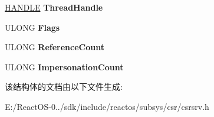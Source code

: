 \begin{DoxyCompactItemize}
\hyperlink{interfacevoid}{H\+A\+N\+D\+LE} {\bfseries Thread\+Handle}
\item 
\mbox{\label{struct___c_s_r___t_h_r_e_a_d_a0a30420ec286ab9a2a9e380c866e5ab2}} 
U\+L\+O\+NG {\bfseries Flags}
\item 
\mbox{\label{struct___c_s_r___t_h_r_e_a_d_a21854cc2eac5c8019867bd637a43c32d}} 
U\+L\+O\+NG {\bfseries Reference\+Count}
\item 
\mbox{\label{struct___c_s_r___t_h_r_e_a_d_a628800b73fd9f3d775b6b8a3cbf0a777}} 
U\+L\+O\+NG {\bfseries Impersonation\+Count}
\end{DoxyCompactItemize}


该结构体的文档由以下文件生成\+:\begin{DoxyCompactItemize}
\item 
E\+:/\+React\+O\+S-\/0../sdk/include/reactos/subsys/csr/csrsrv.\+h\end{DoxyCompactItemize}
